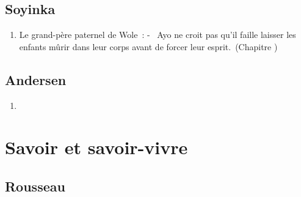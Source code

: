 \documentclass[a4paper, 11pt, hidelinks]{article}
\newcommand{\rb}[1]{\Romanbar{#1}}
\begin{document}
\subsection{Soyinka}


\begin{enumerate}
    \item Le grand-père paternel de Wole : - \og Ayo ne croit pas qu'il faille laisser les enfants mûrir dans leur corps avant de forcer leur esprit. \fg (Chapitre \rb{9})
\end{enumerate}




\subsection{Andersen}


\begin{enumerate}
    \item 
\end{enumerate}
































\section{Savoir et savoir-vivre}



\subsection{Rousseau}
\end{document}
